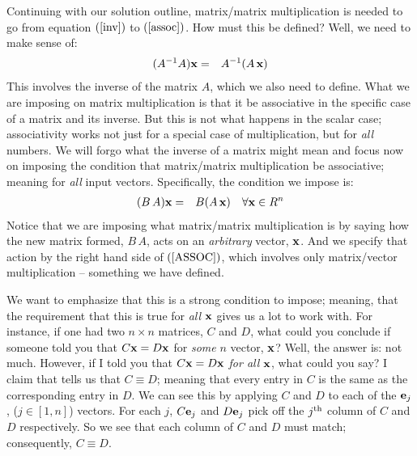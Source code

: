 \documentclass{article}
\begin{document}
Continuing with our solution outline, matrix/matrix multiplication is needed
to go from equation $(\ref{inv})$ to $(\ref{assoc})$. How must this be defined?
Well, we need to make sense of:
\begin{eqnarray}
  (A^{-1} A) {\bf x} & = & A^{-1} (A \, {\bf x}) 
\end{eqnarray}
This involves the inverse of the matrix $A$, which we also need to define. 
What we are imposing on matrix multiplication is that it be associative in the
specific case of a matrix and its inverse. But this is not what happens in the scalar case;
associativity works not just for a special case of multiplication, but for {\em all\/} numbers.
We will forgo what the inverse of a matrix might mean and focus now on imposing the 
condition that matrix/matrix multiplication be associative; meaning for {\em all\/} input vectors.
Specifically, the condition we impose is:
\begin{eqnarray}
	(B\, A) {\bf x} & = & B (A \, {\bf x}) \quad \forall {\bf x} \in R^n \label{ASSOC}
\end{eqnarray}
Notice that we are imposing what matrix/matrix multiplication is by saying how the 
new matrix formed, $B \, A$, acts on an {\em arbitrary\/} vector, ${\bf x}$. And we 
specify that action by the right hand side of $(\ref{ASSOC})$, which involves only matrix/vector
multiplication -- something we have defined.

We want to emphasize that this is a strong condition to impose; meaning, that the 
requirement that this is true for {\em all\/} ${\bf x}$ gives us a lot to work with.
For instance, if one had two $n\times n$ matrices, $C$ and $D$, what could you conclude if someone
told you that $C {\bf x} = D {\bf x}$ for {\em some\/} $n$ vector, ${\bf x}$?
Well, the answer is: not much.
However, if I told you that $C {\bf x} = D {\bf x}$ {\em for all\/} ${\bf x}$, what could you say?
I claim that tells us that $C \equiv D$; meaning that every entry in $C$ is the same as the corresponding
entry in $D$. We can see this by applying $C$ and $D$ to each of the ${\bf e}_j$, ($j \in [1, n]$) vectors.
For each $j$, $C {\bf e}_j$ and $D {\bf e}_j$ pick off the $j^{\rm th}$ column of 
$C$ and $D$ respectively. So we see that each column of $C$ and $D$ must match; consequently,
$C \equiv D$.
\end{document}
